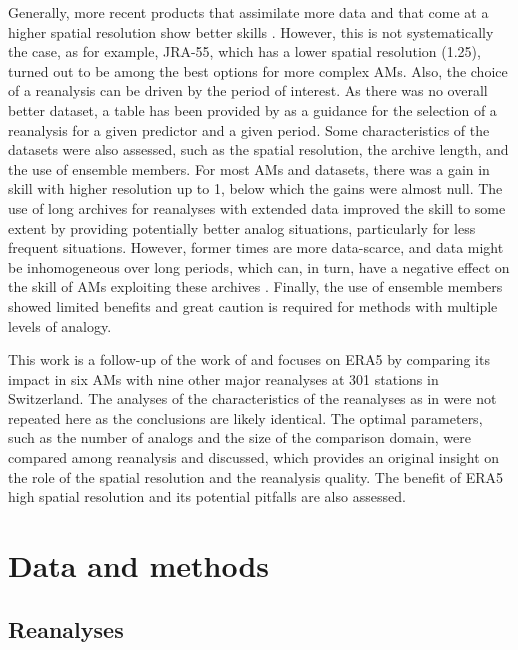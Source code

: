 \documentclass[alpha-refs]{wiley-article}
\begin{document}
Generally, more recent products that assimilate more data and that come at a higher spatial resolution show better skills \citep{Horton2018b}. However, this is not systematically the case, as for example, JRA-55, which has a lower spatial resolution (1.25\degree), turned out to be among the best options for more complex AMs. Also, the choice of a reanalysis can be driven by the period of interest. As there was no overall better dataset, a table has been provided by \citet{Horton2018b} as a guidance for the selection of a reanalysis for a given predictor and a given period. Some characteristics of the datasets were also assessed, such as the spatial resolution, the archive length, and the use of ensemble members. For most AMs and datasets, there was a gain in skill with higher resolution up to 1\degree, below which the gains were almost null. The use of long archives for reanalyses with extended data improved the skill to some extent by providing potentially better analog situations, particularly for less frequent situations. However, former times are more data-scarce, and data might be inhomogeneous over long periods, which can, in turn, have a negative effect on the skill of AMs exploiting these archives \citep{Horton2018b}. Finally, the use of ensemble members showed limited benefits and great caution is required for methods with multiple levels of analogy.

This work is a follow-up of the work of \citet{Horton2018b} and focuses on ERA5 by comparing its impact in six AMs with nine other major reanalyses at 301 stations in Switzerland. The analyses of the characteristics of the reanalyses as in \citet{Horton2018b} were not repeated here as the conclusions are likely identical. The optimal parameters, such as the number of analogs and the size of the comparison domain, were compared among reanalysis and discussed, which provides an original insight on the role of the spatial resolution and the reanalysis quality. The benefit of ERA5 high spatial resolution and its potential pitfalls are also assessed.


\section{Data and methods}
\label{sec:data_methods}

\subsection{Reanalyses}
\label{sec:reanalyses}
\end{document}
